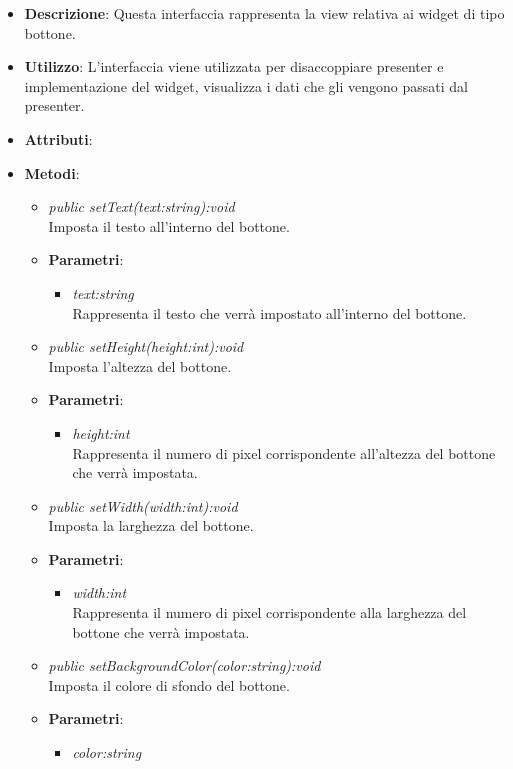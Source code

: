 \begin{itemize}
\item \textbf{Descrizione}: Questa interfaccia rappresenta la view relativa ai widget di tipo bottone.
\item \textbf{Utilizzo}: L'interfaccia viene utilizzata per disaccoppiare presenter e implementazione del widget, visualizza i dati che gli vengono passati dal presenter.
\item \textbf{Attributi}:
\item \textbf{Metodi}:
	\begin{itemize}
	\item \textit{public setText(text:string):void}\\
	Imposta il testo all'interno del bottone.
		\item{\textbf{Parametri}: \begin{itemize}
		\item \textit{text:string}\\
		Rappresenta il testo che verrà impostato all'interno del bottone.
		\end{itemize}}
	\item \textit{public setHeight(height:int):void}\\
	Imposta l'altezza del bottone.
		\item{\textbf{Parametri}: \begin{itemize}
		\item \textit{height:int}\\
		Rappresenta il numero di pixel corrispondente all'altezza del bottone che verrà impostata.
		\end{itemize}}
	\item \textit{public setWidth(width:int):void}\\
	Imposta la larghezza del bottone.
		\item{\textbf{Parametri}: \begin{itemize}
		\item \textit{width:int}\\
		Rappresenta il numero di pixel corrispondente alla larghezza del bottone che verrà impostata.
		\end{itemize}}
	\item \textit{public setBackgroundColor(color:string):void}\\
	Imposta il colore di sfondo del bottone.
		\item{\textbf{Parametri}: \begin{itemize}
		\item \textit{color:string}\\

\end{itemize}}
\end{itemize}
\end{itemize}
